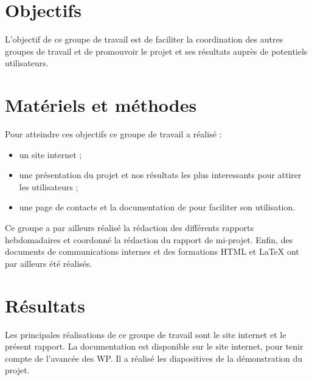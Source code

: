 \section{Objectifs}
L'objectif de ce groupe de travail est de faciliter la coordination des autres groupes de travail et de promouvoir le projet et ses résultats auprès de potentiels utilisateurs.

\section{Matériels et méthodes}
Pour atteindre ces objectifs ce groupe de travail a réalisé :
\begin{itemize}
  \item un site internet ;
  \item une présentation du projet et nos résultats les plus interessants pour attirer les utilisateurs ;
  \item une page de contacts et la documentation de \coquille{} pour faciliter son utilisation.
\end{itemize}

Ce groupe a par ailleurs réalisé la rédaction des différents rapports hebdomadaires et coordonné la rédaction du rapport de mi-projet. Enfin, des documents de communications internes et des formations HTML et \LaTeX{} ont par ailleurs été réalisés.

\section{Résultats}
Les principales réalisations de ce groupe de travail sont le site internet et le présent rapport.
La documentation est disponible sur le site internet, pour tenir compte de l'avancée des WP. Il a réalisé les diapositives de la démonstration du projet.

